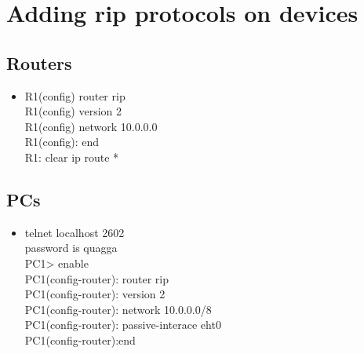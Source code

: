 \documentclass[12pt]{article}
\begin{document}
\section{Adding rip protocols on devices}
\subsection{Routers}
\begin{itemize}
    \item R1(config) router rip\\
          R1(config) version 2\\
          R1(config) network 10.0.0.0\\
          R1(config): end\\
          R1: clear ip route *

\end{itemize}
\subsection{PCs}
\begin{itemize}
    \item telnet localhost 2602 \\
          password is quagga\\
          PC1> enable\\
          PC1(config-router): router rip\\
          PC1(config-router): version 2\\
          PC1(config-router): network 10.0.0.0/8\\
          PC1(config-router): passive-interace eht0\\
          PC1(config-router):end




\end{itemize}
\end{document}
